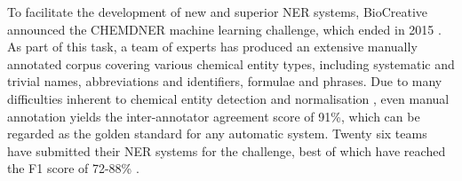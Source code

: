 \documentclass[twocolumn]{bmcart}%
\begin{document}
To facilitate the development of new and superior NER systems, BioCreative  announced the CHEMDNER machine learning challenge, which ended in 2015 \cite{Krallinger2015}.
As part of this task, a team of experts has produced an extensive manually annotated corpus covering various chemical entity types, including systematic and trivial names, abbreviations and identifiers, formulae and phrases.
Due to many difficulties inherent to chemical entity detection and normalisation \cite{Krallinger2015}, even manual annotation yields the inter-annotator agreement score of 91\%, which can be regarded as the golden standard for any automatic system.
Twenty six teams have submitted their NER systems for the challenge, best of which have reached the F1 score of 72-88\% \cite{Leaman2015, Akhondi2015, Khabsa2015, Dai2015, Xu2015, Tang2015, Lowe2015, Lu2015}.
\end{document}
